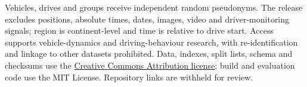 Vehicles, drives and groups receive independent random pseudonyms. The release excludes positions, absolute times, dates, images, video and driver-monitoring signals; region is continent-level and time is relative to drive start. Access supports vehicle-dynamics and driving-behaviour research, with re-identification and linkage to other datasets prohibited. Data, indexes, split lists, schema and checksums use the \href{https://creativecommons.org/licenses/by/4.0/}{Creative Commons Attribution license}; build and evaluation code use the MIT License. Repository links are withheld for review.
